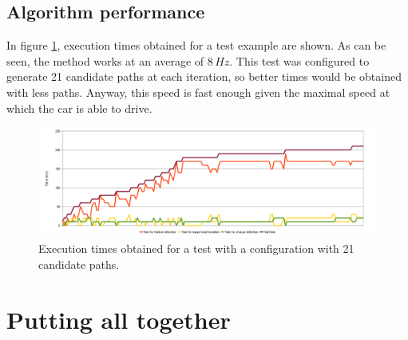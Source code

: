 \subsection{Algorithm performance}\label{ch:chapter07_02_04}

In figure \ref{fig:cp07_times}, execution times obtained for a test example are shown. As can be seen, the method works at an average of $8\,Hz$. This test was configured to generate 21 candidate paths at each iteration, so better times would be obtained with less paths. Anyway, this speed is fast enough given the maximal speed at which the car is able to drive.

\begin{figure}[h!]
  \centering
  \includegraphics[trim=50 50 90 60, clip]{times}
  \caption{Execution times obtained for a test with a configuration with 21 candidate paths.}\label{fig:cp07_times}
\end{figure}

\section{Putting all together}\label{ch:chapter08_08}

